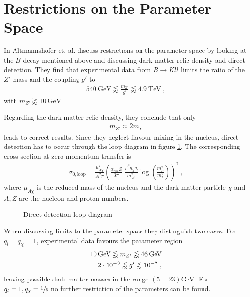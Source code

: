 
\section{Restrictions on the Parameter Space\label{sec:ParamSpace}}
In \cite{Z} Altmannshofer et. al. discuss restrictions on the parameter space by looking at the $B$ decay mentioned above and discussing dark matter relic density and direct detection. They find that experimental data from $B\rightarrow Kl\bar{l}$ limits the ratio of the $Z'$ mass and the coupling $g'$ to
\begin{align}\label{eq:BoundBS}
	\SI{540}{\giga\electronvolt}\lessapprox\frac{m_{Z'}}{g'}\lessapprox\SI{4.9}{\tera\electronvolt} \ ,
\end{align}
with $m_{Z'}\gtrapprox\SI{10}{\giga\electronvolt}$.


Regarding the dark matter relic density, they conclude that only
\begin{align}\label{eq:Relic}
	m_{Z'}\approx 2m_\chi
\end{align}
leads to correct results. Since they neglect flavour mixing in the nucleus, direct detection has to occur through the loop diagram in figure \ref{fig:Loop}. The corresponding cross section at zero momentum transfer is
\begin{align}\label{eq:Loop}
	\sigma_{0,\text{loop}} = \frac{\mu_{A\chi}^2}{A^2\pi}\left(\frac{\alpha_{em}Z}{3\pi}\ \frac{g'^2q_\chi q_l}{m_{Z'}^2}\log\left(\frac{m_\mu^2}{m_\tau^2}\right)\right)^2 \ ,
\end{align}
where $\mu_{A\chi}$ is the reduced mass of the nucleus and the dark matter particle $\chi$ and $A,Z$ are the nucleon and proton numbers.

\begin{figure}[h!]
	\centering
	
	\caption{Direct detection loop diagram}
	\label{fig:Loop}
\end{figure}


When discussing limits to the parameter space they distinguish two cases. For $q_l=q_\chi=1$, experimental data favours the parameter region
\begin{align}\label{eq:Boundg}
	\SI{10}{\giga\electronvolt}\lessapprox m_{Z'}\lessapprox\SI{46}{\giga\electronvolt}\notag \\
	\SI{2e-3}{}\lessapprox g'\lessapprox\SI{e-2}{} \ ,
\end{align}
leaving possible dark matter masses in the range $(5-23)\si{\giga\electronvolt}$. For $q_l=1,q_\chi=\sfrac{1}{6}$ no further restriction of the parameters can be found.


